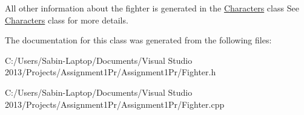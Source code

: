 All other information about the fighter is generated in the \hyperlink{class_characters}{Characters} class See \hyperlink{class_characters}{Characters} class for more details. 

The documentation for this class was generated from the following files\+:\begin{DoxyCompactItemize}
\item 
C\+:/\+Users/\+Sabin-\/\+Laptop/\+Documents/\+Visual Studio 2013/\+Projects/\+Assignment1\+Pr/\+Assignment1\+Pr/Fighter.\+h\item 
C\+:/\+Users/\+Sabin-\/\+Laptop/\+Documents/\+Visual Studio 2013/\+Projects/\+Assignment1\+Pr/\+Assignment1\+Pr/Fighter.\+cpp\end{DoxyCompactItemize}
